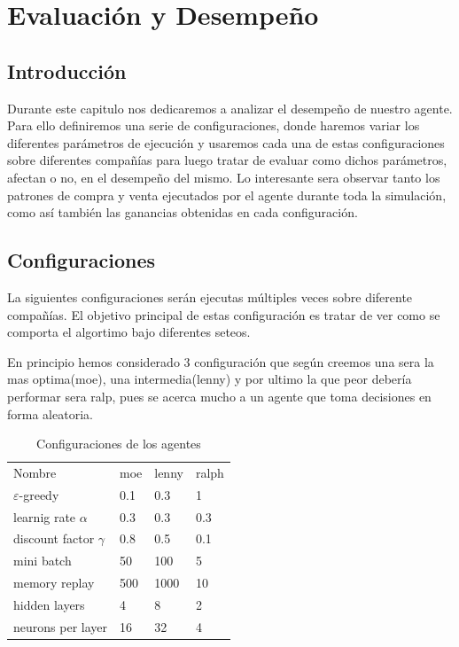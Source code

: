 \chapter{Evaluación y Desempeño}


\section{Introducción}

Durante este capitulo nos dedicaremos a analizar el desempeño de nuestro agente. Para ello definiremos una serie de configuraciones, donde haremos variar los diferentes parámetros de ejecución y usaremos cada una de estas configuraciones sobre diferentes compañías para luego tratar de evaluar como dichos parámetros, afectan o no, en el desempeño del mismo. Lo interesante sera observar tanto los patrones de compra y venta ejecutados por el agente durante toda la simulación, como así también las ganancias obtenidas en cada configuración.

\section{Configuraciones}

La siguientes configuraciones serán ejecutas múltiples veces sobre diferente compañías. El objetivo principal de estas configuración es tratar de ver como se comporta el algortimo bajo diferentes seteos. 

En principio hemos considerado 3 configuración que según creemos una sera la  mas optima(moe), una intermedia(lenny) y por ultimo la que peor debería performar sera ralp, pues se acerca mucho a un agente que toma decisiones en forma aleatoria. 

\begin{table}[]
	\centering
	\caption{Configuraciones de los agentes}
	\label{my-label}
	\begin{tabular}{llll}
		Nombre                     & moe & lenny & ralph \\
		$\varepsilon$-greedy       & 0.1 & 0.3   & 1     \\
		learnig rate    $\alpha$   & 0.3 & 0.3   & 0.3   \\
		discount factor $\gamma$   & 0.8 & 0.5   & 0.1   \\
		mini batch                 & 50  & 100   & 5    \\
		memory replay      		   & 500 & 1000  & 10     \\
		hidden layers     		   & 4   & 8     & 2     \\
		neurons per layer  		   & 16  & 32    & 4    
	\end{tabular}
\end{table}

